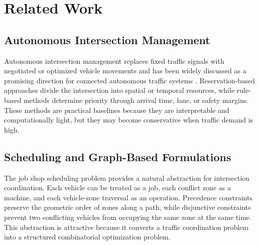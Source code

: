 \section{Related Work}
\label{sec:related_work}

\subsection{Autonomous Intersection Management}
Autonomous intersection management replaces fixed traffic signals with negotiated or optimized vehicle movements and has been widely discussed as a promising direction for connected autonomous traffic systems \cite{zhong2020autonomous}. Reservation-based approaches divide the intersection into spatial or temporal resources, while rule-based methods determine priority through arrival time, lane, or safety margins. These methods are practical baselines because they are interpretable and computationally light, but they may become conservative when traffic demand is high.

\subsection{Scheduling and Graph-Based Formulations}
The job shop scheduling problem provides a natural abstraction for intersection coordination. Each vehicle can be treated as a job, each conflict zone as a machine, and each vehicle-zone traversal as an operation. Precedence constraints preserve the geometric order of zones along a path, while disjunctive constraints prevent two conflicting vehicles from occupying the same zone at the same time. This abstraction is attractive because it converts a traffic coordination problem into a structured combinatorial optimization problem.

